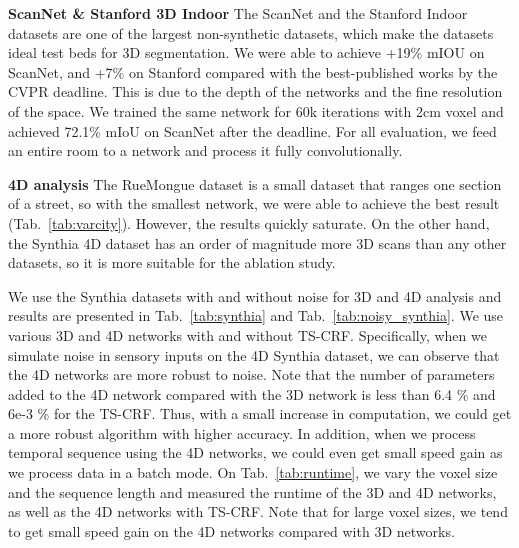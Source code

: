 \textbf{ScanNet \& Stanford 3D Indoor} The ScanNet and the Stanford Indoor datasets are one of the largest non-synthetic datasets, which make the datasets ideal test beds for 3D segmentation. We were able to achieve +19\% mIOU on ScanNet, and +7\% on Stanford compared with the best-published works by the CVPR deadline. This is due to the depth of the networks and the fine resolution of the space. We trained the same network for 60k iterations with 2cm voxel and achieved 72.1\% mIoU on ScanNet after the deadline. For all evaluation, we feed an entire room to a network and process it fully convolutionally.


\textbf{4D analysis} The RueMongue dataset is a small dataset that ranges one section of a street, so with the smallest network, we were able to achieve the best result (Tab.~\ref{tab:varcity}). However, the results quickly saturate. On the other hand, the Synthia 4D dataset has an order of magnitude more 3D scans than any other datasets, so it is more suitable for the ablation study.

We use the Synthia datasets with and without noise for 3D and 4D analysis and results are presented in Tab.~\ref{tab:synthia} and Tab.~\ref{tab:noisy_synthia}. We use various 3D and 4D networks with and without TS-CRF. Specifically, when we simulate noise in sensory inputs on the 4D Synthia dataset, we can observe that the 4D networks are more robust to noise. Note that the number of parameters added to the 4D network compared with the 3D network is less than 6.4 \% and $6\text{e-}3$ \% for the TS-CRF. Thus, with a small increase in computation, we could get a more robust algorithm with higher accuracy. In addition, when we process temporal sequence using the 4D networks, we could even get small speed gain as we process data in a batch mode. On Tab.~\ref{tab:runtime}, we vary the voxel size and the sequence length and measured the runtime of the 3D and 4D networks, as well as the 4D networks with TS-CRF. Note that for large voxel sizes, we tend to get small speed gain on the 4D networks compared with 3D networks.




